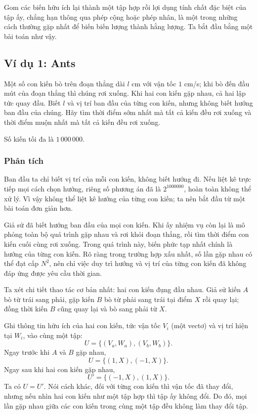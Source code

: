 \documentclass[11pt]{article}
\begin{document}
Gom các biến hữu ích lại thành một tập hợp rồi lợi dụng tính chất đặc biệt của
tập ấy, chẳng hạn thông qua phép cộng hoặc phép nhân, là một trong những cách
thường gặp nhất để biến biến lượng thành hằng lượng. Ta bắt đầu bằng một bài
toán như vậy.

\subsection{Ví dụ 1: Ants}

Một số con kiến bò trên đoạn thẳng dài $l$ cm với vận tốc $1$ cm/s; khi bò đến
đầu mút của đoạn thẳng thì chúng rơi xuống. Khi hai con kiến gặp nhau, cả hai
lập tức quay đầu. Biết $l$ và vị trí ban đầu của từng con kiến, nhưng không
biết hướng ban đầu của chúng. Hãy tìm thời điểm sớm nhất mà tất cả kiến đều
rơi xuống và thời điểm muộn nhất mà tất cả kiến đều rơi xuống.

Số kiến tối đa là $1\,000\,000$.

\subsubsection*{Phân tích}

Ban đầu ta chỉ biết vị trí của mỗi con kiến, không biết hướng đi. Nếu liệt kê
trực tiếp mọi cách chọn hướng, riêng số phương án đã là $2^{1000000}$, hoàn
toàn không thể xử lý. Vì vậy không thể liệt kê hướng của từng con kiến; ta
nên bắt đầu từ một bài toán đơn giản hơn.

Giả sử đã biết hướng ban đầu của mọi con kiến. Khi ấy nhiệm vụ còn lại là mô
phỏng toàn bộ quá trình gặp nhau và rơi khỏi đoạn thẳng, rồi tìm thời điểm con
kiến cuối cùng rơi xuống. Trong quá trình này, biến phức tạp nhất chính là
hướng của từng con kiến. Rõ ràng trong trường hợp xấu nhất, số lần gặp nhau có
thể đạt cấp $N^2$, nên chỉ việc duy trì hướng và vị trí của từng con kiến đã
không đáp ứng được yêu cầu thời gian.

Ta xét chi tiết thao tác cơ bản nhất: hai con kiến đụng đầu nhau. Giả sử kiến
$A$ bò từ trái sang phải, gặp kiến $B$ bò từ phải sang trái tại điểm $X$ rồi
quay lại; đồng thời kiến $B$ cũng quay lại và bò sang phải từ $X$.

Ghi thông tin hữu ích của hai con kiến, tức vận tốc $V_i$ (một vectơ) và vị
trí hiện tại $W_i$, vào cùng một tập:
\[
  U=\{(V_a,W_a),(V_b,W_b)\}.
\]
Ngay trước khi $A$ và $B$ gặp nhau,
\[
  U=\{(1,X),(-1,X)\}.
\]
Ngay sau khi hai con kiến gặp nhau,
\[
  U'=\{(-1,X),(1,X)\}.
\]
Ta có $U=U'$. Nói cách khác, đối với từng con kiến thì vận tốc đã thay đổi,
nhưng nếu nhìn hai con kiến như một tập hợp thì tập ấy không đổi. Do đó, mọi
lần gặp nhau giữa các con kiến trong cùng một tập đều không làm thay đổi tập.
\end{document}
